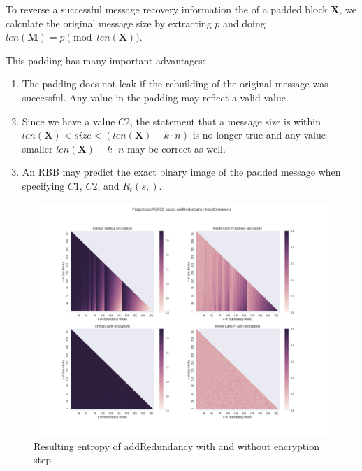 \documentclass[acmsmall, screen, final]{acmart}
\begin{document}
	To reverse a successful message recovery information the of a padded block $\mathbf{X}$, we calculate the original message size by extracting $p$ and doing $len(\mathbf{M})=p \pmod{ len(\mathbf{X})}$.
	
	This padding has many important advantages:
	\begin{enumerate}
		\item The padding does not leak if the rebuilding of the original message was successful. Any value in the padding may reflect a valid value.
		\item Since we have a value $C2$, the statement that a message size is within $len(\mathbf{X})<size<(len(\mathbf{X})-k\cdot n)$ is no longer true and any value smaller $len(\mathbf{X})-k\cdot n$ may be correct as well.
		\item An RBB may predict the exact binary image of the padded message when specifying $C1$, $C2$, and $R_{t}(s,)$.
	\end{enumerate}
	
	\begin{figure}[ht]\centering
		\includegraphics[width=1\columnwidth]{randomblock_10kb}
		\caption{Resulting entropy of addRedundancy with and without encryption step}
		\label{fig:entropy}
	\end{figure}
	
\end{document}
